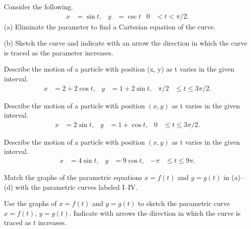 \begin{problem}[WebAssign HW 31, \# 5]
Consider the following.
\[
  \begin{aligned}
    x&=\sin t,&
    y&=\csc t&
    0&<t<\pi/2.
  \end{aligned}
\]
(a) Eliminate the parameter to find a Cartesian equation of the curve.

(b) Sketch the curve and indicate with an arrow the direction in which the
curve is traced as the parameter increases.
\end{problem}
\begin{problem}[WebAssign HW 31, \# 6]
Describe the motion of a particle with position (x, y) as t varies in the
given interval.
\[
  \begin{aligned}
    x&=2+2\cos t,&
    y&=1+2\sin t,&
    \pi/2&\leq t\leq 3\pi/2.
  \end{aligned}
\]
\end{problem}
\begin{problem}[WebAssign HW 31, \# 7]
Describe the motion of a particle with position $(x,y)$ as t varies in the
given interval.
\[
  \begin{aligned}
    x&=2\sin t,&
    y&=1+\cos t,&
    0&\leq t \leq 3\pi/2.
  \end{aligned}
\]
\end{problem}
\begin{problem}[WebAssign HW 31, \# 8]
Describe the motion of a particle with position $(x,y)$ as t varies in the
given interval.
\[
  \begin{aligned}
    x&=4\sin t,&
    y&=9\cos t,&
    -\pi&\leq t\leq 9\pi.
  \end{aligned}
\]
\end{problem}
\begin{problem}[WebAssign HW 31, \# 9]
 Match the graphs of the parametric equations $x=f(t)$ and $y=g(t)$ in
 (a)--(d) with the parametric curves labeled I--IV.
\end{problem}
\begin{problem}[WebAssign HW 31, \# 10]
 Use the graphs of $x=f(t)$ and $y=g(t)$ to sketch the parametric curve
 $x=f(t)$, $y=g(t)$.  Indicate with arrows the direction in which the curve
 is traced as $t$ increases.
\end{problem}

